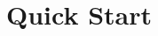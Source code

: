 \documentclass{report}
\begin{document}
% 
% 
% 
% 
% 
% 
% 
% 
% 
% 
% 
% 
% 
% 
% 
% 

\setcounter{chapter}{0}
\addtocounter{chapter}{-1}
\chapter{Quick Start}\label{chp:quick-start}
\end{document}
